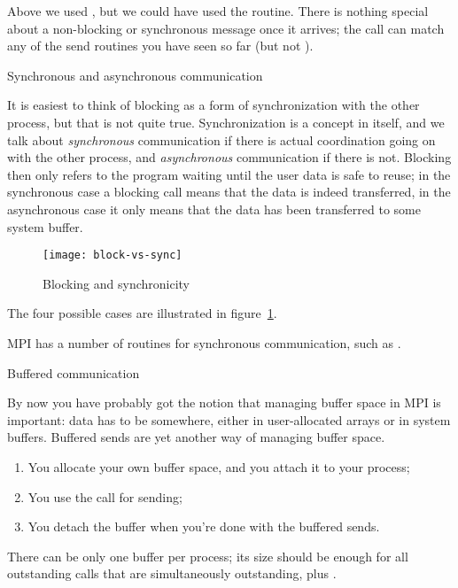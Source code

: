 Above we used , but we could have used the 
routine.  There is nothing special about a non-blocking or synchronous
message once it arrives; the  call can match any of the
send routines you have seen so far (but not ).

 {Synchronous and asynchronous communication}


It is easiest to think of blocking as a form of synchronization with
the other process, but that is not quite true. Synchronization is a
concept in itself, and we talk about \emph{synchronous} communication
if there is actual coordination going on with the other process,
and \emph{asynchronous} communication if there is not. Blocking then
only refers to the program waiting until the user data is safe
to reuse; in the synchronous case a blocking call means that the data
is indeed transferred, in the asynchronous case it only means that the
data has been transferred to some system buffer.
%
\begin{figure}[ht]
\texttt{[image: block-vs-sync]}
\caption{Blocking and synchronicity}
\label{fig:block-sync}
\end{figure}
The four possible cases are illustrated in figure~\ref{fig:block-sync}.

MPI has a number of routines for synchronous communication,
such as .


 {Buffered communication}
\label{sec:buffered}

By now you have probably got the notion that managing buffer
space in MPI is important: data has to be somewhere, either in
user-allocated arrays or in system buffers. Buffered sends are yet another
way of managing buffer space.
\begin{enumerate}
\item You allocate your own buffer space, and you attach it to your process;
\item You use the  call for sending;
\item You detach the buffer when you're done with the buffered sends.
\end{enumerate}

There can be only one buffer per process; its size should be enough
for all outstanding  calls that are simultaneously
outstanding, plus .

